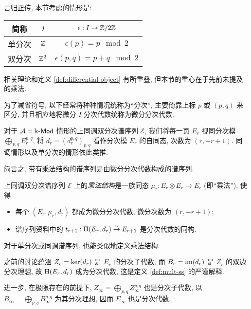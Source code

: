 言归正传, 本节考虑的情形是:
\begin{center}\begin{tabular}{|c|c|c|} \hline
	简称 & $I$ & $\epsilon: I \to \mathbb{Z}/2\mathbb{Z}$ \\ \hline
	单分次 & $\mathbb{Z}$ & $\epsilon(p) = p \;\bmod 2$ \\
	双分次 & $\mathbb{Z}^2$ & $\epsilon(p,q) = p+q \;\bmod 2$ \\ \hline
\end{tabular}\end{center}

相关理论和定义 \ref{def:differential-object} 有所重叠, 但本节的重心在于先前未提及的乘法.

为了减省符号, 以下经常将种种情况统称为``分次'', 主要倚靠上标 $p$ 或 $(p,q)$ 来区分, 并且相应地将微分 $I$-分次代数统称为微分分次代数.

\begin{convention}
	对于 $\mathcal{A} = \Bbbk\text{-}\mathsf{Mod}$ 情形的上同调双分次谱序列 $\mathscr{E}$, 我们将每一页 $E_r$ 视同分次模 $\bigoplus_{p,q} E_r^{p,q}$, 将 $d_r = (d_r^{p,q})_{p,q}$ 看作分次模 $E_r$ 的自同态, 次数为 $(r, -r+1)$. 同调情形以及单分次的情形依此类推.
\end{convention}

简言之, 带有乘法结构的谱序列是由微分分次代数构成的谱序列.

\begin{definition}\label{def:mult-ss}
	上同调双分次谱序列 $\mathscr{E}$ 上的\emph{乘法结构}是一族同态 $\mu_r: E_r \otimes E_r \to E_r$ (即``乘法''), 使得
	\begin{itemize}
		\item 每个 $(E_r, \mu_r, d_r)$ 都成为微分分次代数, 微分次数为 $(r, -r+1)$;
		\item 谱序列资料中的 $t_{r+1}: \operatorname{H}(E_r, d_r) \stackrel{\sim}{\rightarrow} E_{r+1}$ 是分次代数的同构.
	\end{itemize}
	对于单分次或同调谱序列, 也能类似地定义乘法结构.
\end{definition}

之前的讨论蕴涵 $Z_r = \operatorname{ker}(d_r)$ 是 $E_r$ 的分次子代数, 而 $B_r = \operatorname{im}(d_r)$ 是 $Z_r$ 的双边分次理想, 故 $\operatorname{H}(E_r, d_r)$ 成为分次代数, 这是定义 \ref{def:mult-ss} 的严谨解释.

进一步, 在极限存在的前提下, $Z_\infty = \bigoplus_{p,q} Z_{\infty}^{p,q}$ 也是分次子代数, 以 $B_\infty = \bigoplus_{p,q} B_{\infty}^{p,q}$ 为其分次理想, 因而 $E_\infty$ 也是分次代数.

